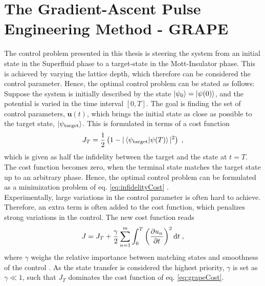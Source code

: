 \section{The Gradient-Ascent Pulse Engineering Method - GRAPE}
The control problem presented in this thesis is steering the system from an initial state in the Superfluid phase to a target-state in the Mott-Insulator phase. This is achieved by varying the lattice depth, which therefore can be considered the control parameter. Hence, the optimal control problem can be stated as follows: 
Suppose the system is initially described by the state $\ket{\psi_0} = \ket{\psi (0)}$, and the potential is varied in the time interval $[ 0 , T]$. The goal is finding the set of control parameters, $\boldsymbol{u}(t)$, which brings the initial state as close as possible to the target state, $\ket{\psi_{\mathrm{target}}}$. This is formulated in terms of a cost function
\begin{equation}
	J_T = \frac{1}{2} \left( 1-|\braket{\psi_{\mathrm{target}} | \psi (T)}|^2 \right) \; ,
	\label{eq:infidelityCost}
\end{equation}
which is given as half the infidelity between the target and the state at $t=T$. The cost function becomes zero, when the terminal state matches the target state up to an arbitrary phase. Hence, the optimal control problem can be formulated as a minimization problem of eq. \eqref{eq:infidelityCost} \cite{Jager2014}.\\
Experimentally, large variations in the control parameter is often hard to achieve. Therefore, an extra term is often added to the cost function, which penalizes strong variations in the control. The new cost function reads
\begin{equation}
	J = J_T + \frac{\gamma}{2} \sum_{n=1}^{m} \int_{0}^{T} \left( \pdv{u_n}{t} \right)^2 \mathrm{d}t \; ,
	\label{eq:grapeCost}
\end{equation}
where $\gamma$ weighs the relative importance between matching states and smoothness of the control \cite{Jager2014}. As the state transfer is considered the highest priority, $\gamma$ is set as $\gamma \ll 1$, such that $J_T$ dominates the cost function of eq. \eqref{eq:grapeCost}.\\

